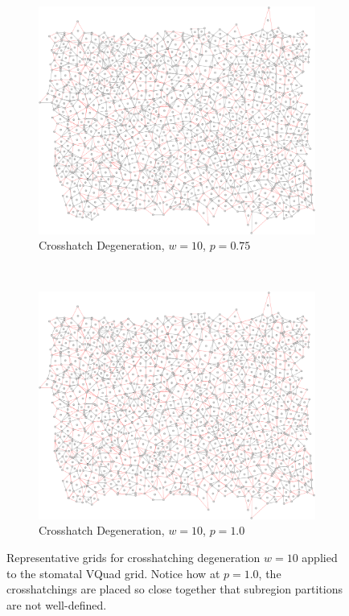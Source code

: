 \documentclass[a4paper,11pt]{report}
\begin{document}
\begin{figure}[htp]
\begin{subfigure}[t]{0.4\textwidth}
  \end{subfigure}

\begin{subfigure}[t]{0.4\textwidth}
  \centering
  \includegraphics[width=\textwidth]{ch6_figs/cross_hatch_p75_w10}
  \caption{Crosshatch Degeneration, $w=10$, $p=0.75$}

  \end{subfigure}
~
\begin{subfigure}[t]{0.4\textwidth}
  \centering
  \includegraphics[width=\textwidth]{ch6_figs/cross_hatch_p100_w10}
  \caption{Crosshatch Degeneration, $w=10$, $p=1.0$}

  \end{subfigure}

\caption[Crosshatch Degeneration, $w=10$]{
  Representative grids for crosshatching degeneration $w=10$ applied to the stomatal VQuad grid. Notice how at $p=1.0$, the crosshatchings are placed so close together that subregion partitions are not well-defined.
}
\label{fig:ch_w10_grid}
\end{figure}
\end{document}
